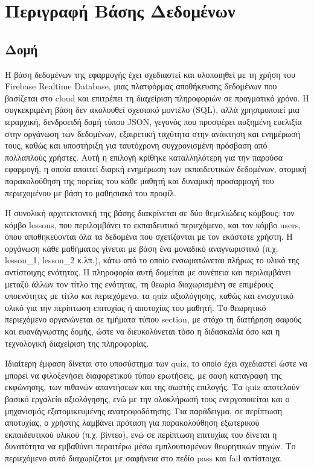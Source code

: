 \documentclass[11pt]{report}
\begin{document}
\chapter{Περιγραφή Βάσης Δεδομένων}
\section{Δομή}

Η βάση δεδομένων της εφαρμογής έχει σχεδιαστεί και υλοποιηθεί με τη χρήση του Firebase Realtime Database, μιας πλατφόρμας αποθήκευσης δεδομένων που βασίζεται στο cloud και επιτρέπει τη διαχείριση πληροφοριών σε πραγματικό χρόνο. Η συγκεκριμένη βάση δεν ακολουθεί σχεσιακό μοντέλο (SQL), αλλά χρησιμοποιεί μια ιεραρχική, δενδροειδή δομή τύπου JSON, γεγονός που προσφέρει αυξημένη ευελιξία στην οργάνωση των δεδομένων, εξαιρετική ταχύτητα στην ανάκτηση και ενημέρωσή τους, καθώς και υποστήριξη για ταυτόχρονη συγχρονισμένη πρόσβαση από πολλαπλούς χρήστες. Αυτή η επιλογή κρίθηκε καταλληλότερη για την παρούσα εφαρμογή, η οποία απαιτεί διαρκή ενημέρωση των εκπαιδευτικών δεδομένων, ατομική παρακολούθηση της πορείας του κάθε μαθητή και δυναμική προσαρμογή του περιεχομένου με βάση το μαθησιακό του προφίλ.

Η συνολική αρχιτεκτονική της βάσης διακρίνεται σε δύο θεμελιώδεις κόμβους: τον κόμβο lessons, που περιλαμβάνει το εκπαιδευτικό περιεχόμενο, και τον κόμβο users, όπου αποθηκεύονται όλα τα δεδομένα που σχετίζονται με τον εκάστοτε χρήστη. Η οργάνωση κάθε μαθήματος γίνεται με βάση ένα μοναδικό αναγνωριστικό (π.χ. lesson\_1, lesson\_2 κ.λπ.), κάτω από το οποίο ενσωματώνεται πλήρως το υλικό της αντίστοιχης ενότητας. Η πληροφορία αυτή δομείται με συνέπεια και περιλαμβάνει μεταξύ άλλων τον τίτλο της ενότητας, τη θεωρία διαχωρισμένη σε επιμέρους υποενότητες με τίτλο και περιεχόμενο, τα quiz αξιολόγησης, καθώς και ενισχυτικό υλικό για την περίπτωση επιτυχίας ή αποτυχίας του μαθητή. Το θεωρητικό περιεχόμενο οργανώνεται σε τμήματα τύπου section, με στόχο τη διατήρηση σαφούς και ευανάγνωστης δομής, ώστε να διευκολύνεται τόσο η διδασκαλία όσο και η τεχνολογική διαχείριση της πληροφορίας.

Ιδιαίτερη έμφαση δίνεται στο υποσύστημα των quiz, το οποίο έχει σχεδιαστεί ώστε να μπορεί να φιλοξενήσει διαφορετικού τύπου ερωτήσεις, με σαφή καταγραφή της εκφώνησης, των πιθανών απαντήσεων και της σωστής επιλογής. Τα quiz αποτελούν βασικό εργαλείο αξιολόγησης, ενώ με την ολοκλήρωσή τους ενεργοποιείται και ο μηχανισμός εξατομικευμένης ανατροφοδότησης. Για παράδειγμα, σε περίπτωση αποτυχίας, ο χρήστης λαμβάνει πρόταση για παρακολούθηση εξωτερικού εκπαιδευτικού υλικού (π.χ. βίντεο), ενώ σε περίπτωση επιτυχίας του δίνεται η δυνατότητα να εμβαθύνει περαιτέρω μέσω εμπλουτισμένων θεωρητικών πηγών. Το περιεχόμενο αυτό διαχωρίζεται με σαφήνεια στο πεδίο pass και fail αντίστοιχα.
\end{document}
